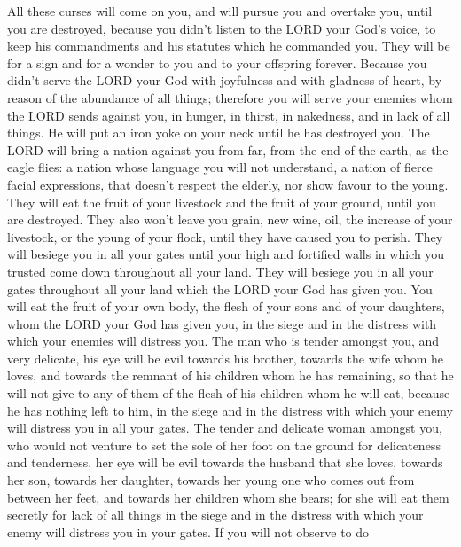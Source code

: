  All these curses will come on you, and will pursue you and
overtake you, until you are destroyed, because you didn't listen to the
LORD your God's voice, to keep his commandments and his statutes which
he commanded you.  They will be for a sign and for a wonder
to you and to your offspring forever.  Because you didn't
serve the LORD your God with joyfulness and with gladness of heart, by
reason of the abundance of all things;  therefore you will
serve your enemies whom the LORD sends against you, in hunger, in
thirst, in nakedness, and in lack of all things. He will put an iron
yoke on your neck until he has destroyed you.  The LORD
will bring a nation against you from far, from the end of the earth, as
the eagle flies: a nation whose language you will not understand,
 a nation of fierce facial expressions, that doesn't
respect the elderly, nor show favour to the young.  They
will eat the fruit of your livestock and the fruit of your ground, until
you are destroyed. They also won't leave you grain, new wine, oil, the
increase of your livestock, or the young of your flock, until they have
caused you to perish.  They will besiege you in all your
gates until your high and fortified walls in which you trusted come down
throughout all your land. They will besiege you in all your gates
throughout all your land which the LORD your God has given you.
 You will eat the fruit of your own body, the flesh of your
sons and of your daughters, whom the LORD your God has given you, in the
siege and in the distress with which your enemies will distress you.
 The man who is tender amongst you, and very delicate, his
eye will be evil towards his brother, towards the wife whom he loves,
and towards the remnant of his children whom he has remaining,
 so that he will not give to any of them of the flesh of
his children whom he will eat, because he has nothing left to him, in
the siege and in the distress with which your enemy will distress you in
all your gates.  The tender and delicate woman amongst you,
who would not venture to set the sole of her foot on the ground for
delicateness and tenderness, her eye will be evil towards the husband
that she loves, towards her son, towards her daughter, 
towards her young one who comes out from between her feet, and towards
her children whom she bears; for she will eat them secretly for lack of
all things in the siege and in the distress with which your enemy will
distress you in your gates.  If you will not observe to do
